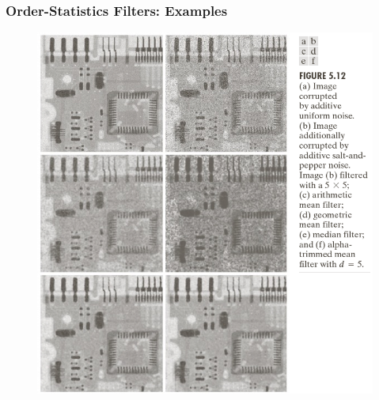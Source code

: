 \documentclass[english,11pt,table,handout]{beamer}
\begin{document}
\frame
{
	\frametitle{Order-Statistics Filters: Examples }
	\begin{figure}[!h]
		\includegraphics[scale=0.6]{alpha_trimmed.png}
	\end{figure}
	
}
\end{document}
